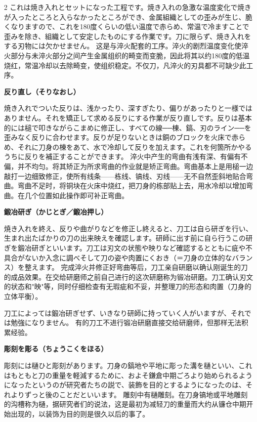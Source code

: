 \documentclass[12pt,UTF8]{ctexbook}
\begin{document}
\vspace{0.2em}

\begin{paracol}{2}
これは焼き入れとセットになった工程です。焼き入れの急激な温度変化で焼きが入ったところと入らなかったところができ、金属組織としての歪みが生じ、脆くなりますので、これを180度くらいの低い温度で赤らめ、常温で冷ますことで歪みを除き、組織として安定したものにする作業です。刀に限らず、焼き入れをする刃物には欠かせません。
\switchcolumn*
这是与淬火配套的工序。淬火的剧烈温度变化使淬火部分与未淬火部分之间产生金属组织的畸变而变脆，因此将其以约180度的低温烧红，常温冷却以去除畸变，使组织稳定。不仅刀，凡淬火的刃具都不可缺少此工序。
\switchcolumn*

{\bfseries 反り直し（そりなおし）}
\switchcolumn*

焼き入れでついた反りは、浅かったり、深すぎたり、偏りがあったりと一様ではありません。それを矯正して求める反りにする作業が反り直しです。反りは基本的には槌で叩きながらこまめに修正し、すべての線──棟、鎬、刃のライン──を歪みなく反りに合わせます。反りが足りないときは銅のブロックを火床で赤らめ、それに刀身の棟をあて、水で冷却して反りを加えます。これを何箇所かやるうちに反りを補正することができます。
\switchcolumn*
淬火中产生的弯曲有浅有深、有偏有不偏，并不均匀。将其矫正为所求弯曲的作业就是矫正弯曲。弯曲基本上是用槌一边敲打一边细致修正，使所有线条——栋线、镐线、刃线——无不自然歪斜地贴合弯曲。弯曲不足时，将铜块在火床中烧红，把刀身的栋部贴上去，用水冷却以增加弯曲。在几个位置如此操作即可补正弯曲。
\switchcolumn*

{\bfseries 鍛冶研ぎ（かじとぎ／鍛冶押し）}
\switchcolumn*

焼き入れを終え、反りや曲がりなどを修正し終えると、刀工は自ら研ぎを行い、生まれ出たばかりの刀の出来映えを確認します。研師に出す前に自ら行うこの研ぎを鍛冶研ぎといいます。刀工は刃文の状態や映りなど確認するとともに疵や不具合がないか入念に調べそして刀の姿や肉置にくおき（＝刀身の立体的なバランス）を整えます。
\switchcolumn*
完成淬火并修正好弯曲等后，刀工亲自研磨以确认刚诞生的刀的成品效果。在交给研磨师之前自己进行的这次研磨称为锻冶研磨。刀工确认刃文的状态和"映"等，同时仔细检查有无瑕疵和不妥，并整理刀的形态和肉置（刀身的立体平衡）。
\switchcolumn*

刀工によっては鍛冶研ぎせず、いきなり研師に持っていく人がいますが、それでは勉強になりません。
\switchcolumn*
有的刀工不进行锻冶研磨直接交给研磨师，但那样无法积累经验。
\switchcolumn*

{\bfseries 彫刻を彫る（ちょうこくをほる）}
\switchcolumn*

彫刻には樋ひと彫刻があります。刀身の鎬地や平地に彫った溝を樋といい、これはもともと刀の重量を軽減するために、およそ鎌倉中期ごろより始められるようになったというのが研究者たちの説で、装飾を目的とするようになったのは、それよりずっと後のことだといいます。
\switchcolumn*
雕刻中有樋雕刻。在刀身镐地或平地雕刻的沟槽称为樋，据研究者们的说法，这是最初为减轻刀的重量而大约从镰仓中期开始出现的，以装饰为目的则是很久以后的事了。
\end{paracol}
\end{document}
